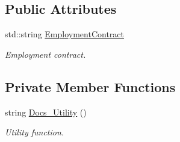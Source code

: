 \subsection*{Public Attributes}
\begin{DoxyCompactItemize}
\item 
\mbox{\label{class_documents_a28e850b0505533696603105c57450770}} 
std\+::string \hyperlink{class_documents_a28e850b0505533696603105c57450770}{Employment\+Contract}
\begin{DoxyCompactList}\small\item\em Employment contract. \end{DoxyCompactList}\end{DoxyCompactItemize}
\subsection*{Private Member Functions}
\begin{DoxyCompactItemize}
\item 
\mbox{\label{class_documents_a7f06bda36f9fe48a22a8c511aa1e2d06}} 
string \hyperlink{class_documents_a7f06bda36f9fe48a22a8c511aa1e2d06}{Docs\+\_\+\+Utility} ()
\begin{DoxyCompactList}\small\item\em Utility function. \end{DoxyCompactList}\end{DoxyCompactItemize}
